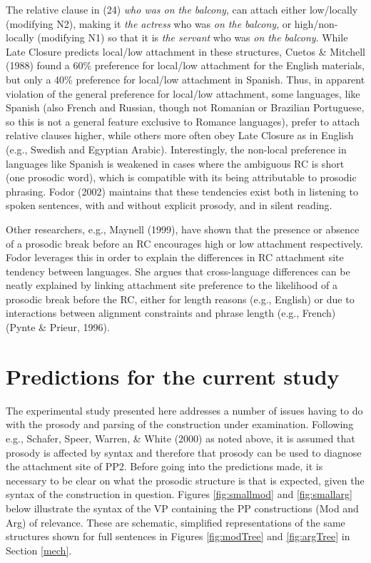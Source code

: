 \documentclass[11pt,oneside]{book}
\begin{document}
The relative clause in (24) \emph{who was on the balcony}, can attach either low/locally (modifying N2), making it \emph{the actress} who was \emph{on the balcony}, or high/non-locally (modifying N1) so that it is \emph{the servant} who was \emph{on the balcony}. While Late Closure predicts local/low attachment in these structures, Cuetos \& Mitchell (1988) found a 60\% preference for local/low attachment for the English materials, but only a 40\% preference for local/low attachment in Spanish. Thus, in apparent violation of the general preference for local/low attachment, some languages, like Spanish (also French and Russian, though not Romanian or Brazilian Portuguese, so this is not a general feature exclusive to Romance languages), prefer to attach relative clauses higher, while others more often obey Late Closure as in English (e.g., Swedish and Egyptian Arabic). Interestingly, the non-local preference in languages like Spanish is weakened in cases where the ambiguous RC is short (one prosodic word), which is compatible with its being attributable to prosodic phrasing. Fodor (2002) maintains that these tendencies exist both in listening to spoken sentences, with and without explicit prosody, and in silent reading.

Other researchers, e.g., Maynell (1999), have shown that the presence or absence of a prosodic break before an RC encourages high or low attachment respectively. Fodor leverages this in order to explain the differences in RC attachment site tendency between languages. She argues that cross-language differences can be neatly explained by linking attachment site preference to the likelihood of a prosodic break before the RC, either for length reasons (e.g., English) or due to interactions between alignment constraints and phrase length (e.g., French) (Pynte \& Prieur, 1996).

\hypertarget{pred}{%
\section{Predictions for the current study}\label{pred}}

The experimental study presented here addresses a number of issues having to do with the prosody and parsing of the construction under examination. Following e.g., Schafer, Speer, Warren, \& White (2000) as noted above, it is assumed that prosody is affected by syntax and therefore that prosody can be used to diagnose the attachment site of PP2. Before going into the predictions made, it is necessary to be clear on what the prosodic structure is that is expected, given the syntax of the construction in question. Figures \ref{fig:smallmod} and \ref{fig:smallarg} below illustrate the syntax of the VP containing the PP constructions (Mod and Arg) of relevance. These are schematic, simplified representations of the same structures shown for full sentences in Figures \ref{fig:modTree} and \ref{fig:argTree} in Section \ref{mech}.
\end{document}
